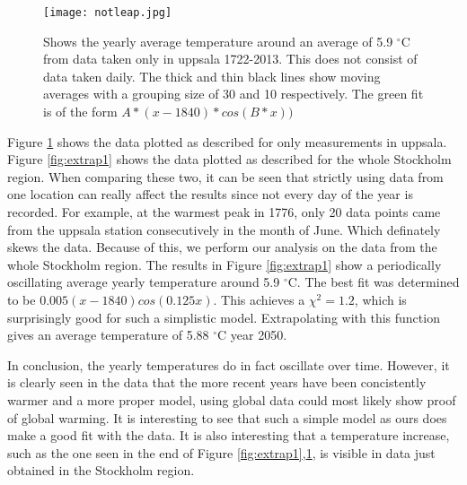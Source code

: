 \begin{figure}[ht]
\begin{center}
\texttt{[image: notleap.jpg]}
\caption{\label{fig:extrap2}Shows the yearly average temperature around an average of 5.9 $^{\circ}$C from data taken only in uppsala 1722-2013. This does not consist of data taken daily. The thick and thin black lines show moving averages with a grouping size of 30 and 10 respectively. The green fit is of the form $A*(x-1840)*cos(B*x))$}
\end{center}
\end{figure}

Figure \ref{fig:extrap2} shows the data plotted as described for only measurements in uppsala. Figure \ref{fig:extrap1} shows the data plotted as described for the whole Stockholm region. When comparing these two, it can be seen that strictly using data from one location can really affect the results since not every day of the year is recorded. For example, at the warmest peak in 1776, only 20 data points came from the uppsala station consecutively in the month of June. Which definately skews the data. Because of this, we perform our analysis on the data from the whole Stockholm region. The results in Figure \ref{fig:extrap1} show a periodically oscillating average yearly temperature around 5.9 $^{\circ}$C. The best fit was determined to be $0.005(x-1840)cos(0.125x)$. This achieves a $\chi ^2=1.2$, which is surprisingly good for such a simplistic model. Extrapolating with this function gives an average temperature of 5.88 $^{\circ}$C year 2050. 

In conclusion, the yearly temperatures do in fact oscillate over time. However, it is clearly seen in the data that the more recent years have been concistently warmer and a more proper model, using global data could most likely show proof of global warming. It is interesting to see that such a simple model as ours does make a good fit with the data. It is also interesting that a temperature increase, such as the one seen in the end of Figure \ref{fig:extrap1},\ref{fig:extrap2}, is visible in data just obtained in the Stockholm region.





